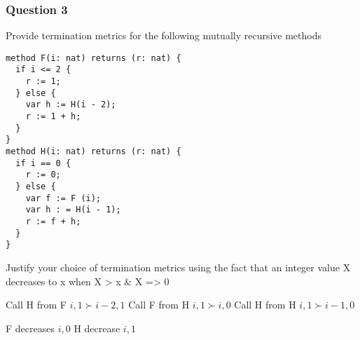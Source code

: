 \subsubsection{Question 3}

Provide termination metrics for the following mutually recursive methods

\begin{verbatim}
method F(i: nat) returns (r: nat) {
  if i <= 2 {
    r := 1;
  } else {
    var h := H(i - 2);
    r := 1 + h;
  }
}
method H(i: nat) returns (r: nat) {
  if i == 0 {
    r := 0;
  } else {
    var f := F (i);
    var h : = H(i - 1);
    r := f + h;
  }
}
\end{verbatim}

Justify your choice of termination metrics using the fact that an integer value X decreases to x
when X > x \& X => 0


Call H from F
  $i, 1 \succ i -2, 1$ \newline
Call F from H
  $i, 1 \succ i, 0$ \newline
Call H from H
  $i, 1 \succ i - 1, 0$ \newline

F decreases $i, 0$ \newline
H decrease $i, 1$